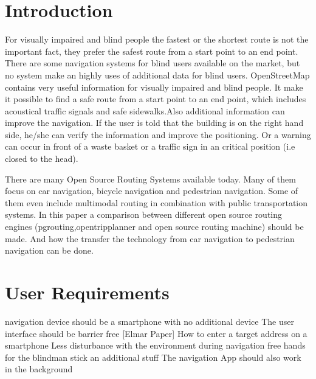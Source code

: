 \documentclass{sig-alternate}
\begin{document}

\section{Introduction}
For visually impaired and blind people the fastest or the shortest route is not the important fact, they prefer the safest route from a start point to an end point. There are some navigation systems for blind users available on the market, but no system make an highly uses of additional data for blind users. 
OpenStreetMap contains very useful information for visually impaired and blind people. It make it possible to find a safe route from a start point to an end point, which includes acoustical traffic signals and safe sidewalks.Also additional information can improve the navigation. If the user is told that the building is on the right hand side, he/she can verify the information and improve the positioning. Or a warning can occur in front of a waste basket or a traffic sign in an critical position (i.e closed to the head). 
 
There are many Open Source Routing Systems available today. Many of them focus on car navigation, bicycle navigation and pedestrian navigation. Some of them even include multimodal routing in combination with public transportation systems. In this paper a comparison between different open source routing engines (pgrouting,opentripplanner and open source routing machine) should be made. And how the transfer the technology from car navigation to pedestrian navigation can be done. 
\section{User Requirements}
navigation device should be a smartphone with no additional device
The user interface should be barrier free [Elmar Paper]
How to enter a target address on a smartphone
Less disturbance with the environment
during navigation free hands for the blindman stick an additional stuff
The navigation App should also work in the background
\end{document}
